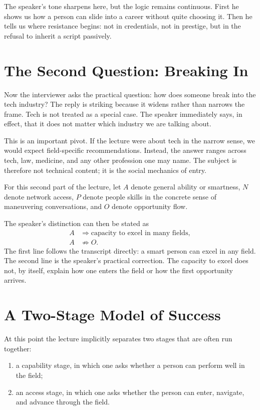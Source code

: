The speaker's tone sharpens here, but the logic remains continuous. First he shows us how a person can slide into a career without quite choosing it. Then he tells us where resistance begins: not in credentials, not in prestige, but in the refusal to inherit a script passively.

\section{The Second Question: Breaking In}

Now the interviewer asks the practical question: how does someone break into the tech industry? The reply is striking because it widens rather than narrows the frame. Tech is not treated as a special case. The speaker immediately says, in effect, that it does not matter which industry we are talking about.

This is an important pivot. If the lecture were about tech in the narrow sense, we would expect field-specific recommendations. Instead, the answer ranges across tech, law, medicine, and any other profession one may name. The subject is therefore not technical content; it is the social mechanics of entry.

\begin{definition}
For this second part of the lecture, let \(A\) denote general ability or smartness, \(N\) denote network access, \(P\) denote people skills in the concrete sense of maneuvering conversations, and \(O\) denote opportunity flow.
\end{definition}

The speaker's distinction can then be stated as
\begin{align}
A &\Longrightarrow \text{capacity to excel in many fields},\\
A &\not\Longrightarrow O.
\end{align}
The first line follows the transcript directly: a smart person can excel in any field. The second line is the speaker's practical correction. The capacity to excel does not, by itself, explain how one enters the field or how the first opportunity arrives.

\section{A Two-Stage Model of Success}

At this point the lecture implicitly separates two stages that are often run together:
\begin{enumerate}
\item a capability stage, in which one asks whether a person can perform well in the field;
\item an access stage, in which one asks whether the person can enter, navigate, and advance through the field.
\end{enumerate}

